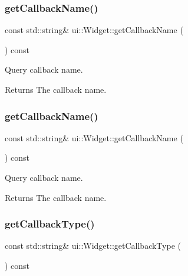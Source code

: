 \subsubsection{\texorpdfstring{get\+Callback\+Name()}{getCallbackName()}\hspace{0.1cm}{\footnotesize\ttfamily [1/2]}}
{\footnotesize\ttfamily const std\+::string\& ui\+::\+Widget\+::get\+Callback\+Name (\begin{DoxyParamCaption}{ }\end{DoxyParamCaption}) const\hspace{0.3cm}{\ttfamily [inline]}}

Query callback name. \begin{DoxyReturn}{Returns}
The callback name. 
\end{DoxyReturn}
\mbox{\label{classui_1_1Widget_a203e45394e7671583ef71c5a9308762e}} 
\subsubsection{\texorpdfstring{get\+Callback\+Name()}{getCallbackName()}\hspace{0.1cm}{\footnotesize\ttfamily [2/2]}}
{\footnotesize\ttfamily const std\+::string\& ui\+::\+Widget\+::get\+Callback\+Name (\begin{DoxyParamCaption}{ }\end{DoxyParamCaption}) const\hspace{0.3cm}{\ttfamily [inline]}}

Query callback name. \begin{DoxyReturn}{Returns}
The callback name. 
\end{DoxyReturn}
\mbox{\label{classui_1_1Widget_a594b66f5c19a8395b7b67ab7b8aa70b4}} 
\subsubsection{\texorpdfstring{get\+Callback\+Type()}{getCallbackType()}\hspace{0.1cm}{\footnotesize\ttfamily [1/2]}}
{\footnotesize\ttfamily const std\+::string\& ui\+::\+Widget\+::get\+Callback\+Type (\begin{DoxyParamCaption}{ }\end{DoxyParamCaption}) const\hspace{0.3cm}{\ttfamily [inline]}}

